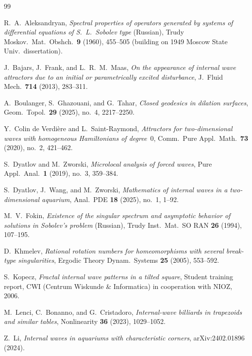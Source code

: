 \documentclass[11pt,reqno]{amsart}
\theoremstyle{definition}
\theoremstyle{remark}
\begin{document}
\begin{thebibliography}{99}

R.~A.~Aleksandryan,
\emph{Spectral properties of operators generated by systems of differential equations of S.~L.~Sobolev type} (Russian),
Trudy Moskov.\ Mat.\ Obshch.\ \textbf{9} (1960), 455--505 (building on 1949 Moscow State Univ.\ dissertation).

J.~Bajars, J.~Frank, and L.~R.~M.~Maas,
\emph{On the appearance of internal wave attractors due to an initial or parametrically excited disturbance},
J.\ Fluid Mech.\ \textbf{714} (2013), 283--311.

A.~Boulanger, S.~Ghazouani, and G.~Tahar,
\emph{Closed geodesics in dilation surfaces},
Geom.\ Topol.\ \textbf{29} (2025), no.~4, 2217--2250.

Y.~Colin de Verdi\`ere and L.~Saint-Raymond,
\emph{Attractors for two-dimensional waves with homogeneous Hamiltonians of degree~$0$},
Comm.\ Pure Appl.\ Math.\ \textbf{73} (2020), no.~2, 421--462.

S.~Dyatlov and M.~Zworski,
\emph{Microlocal analysis of forced waves},
Pure Appl.\ Anal.\ \textbf{1} (2019), no.~3, 359--384.

S.~Dyatlov, J.~Wang, and M.~Zworski,
\emph{Mathematics of internal waves in a two-dimensional aquarium},
Anal.\ PDE \textbf{18} (2025), no.~1, 1--92.

M.~V.~Fokin,
\emph{Existence of the singular spectrum and asymptotic behavior of solutions in Sobolev's problem} (Russian),
Trudy Inst.\ Mat.\ SO RAN \textbf{26} (1994), 107--195.

D.~Khmelev,
\emph{Rational rotation numbers for homeomorphisms with several break-type singularities},
Ergodic Theory Dynam.\ Systems \textbf{25} (2005), 553--592.

S.~Kopecz,
\emph{Fractal internal wave patterns in a tilted square},
Student training report, CWI (Centrum Wiskunde \& Informatica) in cooperation with NIOZ, 2006.

M.~Lenci, C.~Bonanno, and G.~Cristadoro,
\emph{Internal-wave billiards in trapezoids and similar tables},
Nonlinearity \textbf{36} (2023), 1029--1052.

Z.~Li,
\emph{Internal waves in aquariums with characteristic corners},
arXiv:2402.01896 (2024).


\end{thebibliography}
\end{document}
